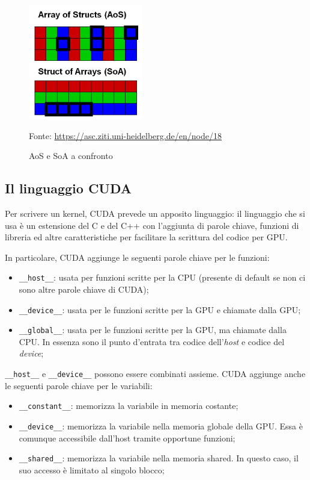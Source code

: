 \documentclass[12pt,a4paper,openright,twoside]{report}
\newcommand{\source}[1]{\vspace{-10pt} \caption*{\scriptsize Fonte: {#1}} }
\begin{document}
\begin{figure}
    \centering
    \includegraphics[width=5cm]{aos.jpg}
    \caption{AoS e SoA a confronto}
    \source{\url{https://asc.ziti.uni-heidelberg.de/en/node/18}}
    \label{img:aos}
\end{figure}

\subsection{Il linguaggio CUDA}

Per scrivere un kernel, CUDA prevede un apposito linguaggio: il linguaggio che si usa è un estensione del C e del C++ con l'aggiunta di parole chiave, funzioni di libreria ed altre caratteristiche per facilitare la scrittura del codice per GPU.

In particolare, CUDA aggiunge le seguenti parole chiave per le funzioni:

\begin{itemize}
    \item \verb|__host__|: usata per funzioni scritte per la CPU (presente di default se non ci sono altre parole chiave di CUDA);
    \item \verb|__device__|: usata per le funzioni scritte per la GPU e chiamate dalla GPU;
    \item \verb|__global__|: usata per le funzioni scritte per la GPU, ma chiamate dalla CPU. In essenza sono il punto d'entrata tra codice dell'\textit{host} e codice del \textit{device};
\end{itemize}

\verb|__host__| e \verb|__device__| possono essere combinati assieme. CUDA aggiunge anche le seguenti parole chiave per le variabili:

\begin{itemize}
    \item \verb|__constant__|: memorizza la variabile in memoria costante;
    \item \verb|__device__|: memorizza la variabile nella memoria globale della GPU. Essa è comunque accessibile dall'host tramite opportune funzioni;
    \item \verb|__shared__|: memorizza la variabile nella memoria shared. In questo caso, il suo accesso è limitato al singolo blocco;
\end{itemize}
\end{document}
